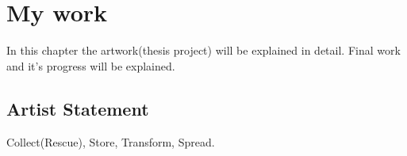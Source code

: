 % 



\chapter{My work}
In this chapter the artwork(thesis project) will be explained in detail. Final work and it's progress will be explained. 

\section{Artist Statement}
Collect(Rescue), Store, Transform, Spread.

